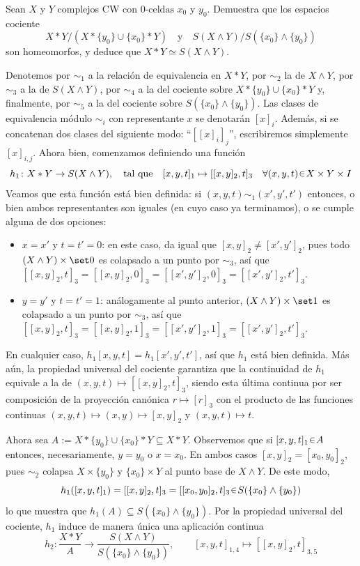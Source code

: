 \setcounter{eje}{23}
\begin{ejer}
Sean $X$ y $Y$ complejos CW con $0\text{-celdas}$ $x_0$ y $y_0$. Demuestra que los espacios cociente
\[
X * Y / (X * \{y_0\} \cup \{x_0\} * Y)
\quad \text{y} \quad
S(X \wedge Y) / S(\{x_0\} \wedge \{y_0\})
\]
son homeomorfos, y deduce que $X * Y \simeq S(X \wedge Y)$.
\end{ejer}
\begin{sol}[Demostración]
Denotemos por $\sim_1$ a la relación de equivalencia en $X*Y$, por $\sim_2$ la de $X \wedge Y$, por $\sim_3$ a la de $S(X \wedge Y)$, por $\sim_4$ a la del cociente sobre $X * \{y_0\} \cup \{x_0\} * Y$ y, finalmente, por $\sim_5$ a la del cociente sobre $S(\{x_0\} \wedge \{y_0\})$. Las clases de equivalencia módulo $\sim_i$ con representante $x$ se denotarán $[x]_i$. Además, si se concatenan dos clases del siguiente modo: \enquote{$[[x]_i]_j$}, escribiremos simplemente $[x]_{i,j}$. Ahora bien, comenzamos definiendo una función 
\[
h_1 \colon X * Y \to S(X \wedge Y),%
\quad\text{tal que}\quad%
[x,y,t]_1 \mapsto [[x,y]_2,t]_3%
\quad\forall (x,y,t)\en X \times Y \times I
\]
Veamos que esta función está bien definida: si $(x,y,t) \sim_1 (x',y',t')$ entonces, o bien ambos representantes son iguales (en cuyo caso ya terminamos), o se cumple alguna de dos opciones:
\begin{itemize}[leftmargin=1.2em]
\item $x=x'$ y $t=t'=0$: en este caso, da igual que $[x,y]_2 \neq [x',y']_2$, pues todo $(X \wedge Y) \times \set0$ es colapsado a un punto por $\sim_3$, así que $[[x,y]_2,t]_3 = [[x,y]_2,0]_3 = [[x',y']_2,0]_3 = [[x',y']_2,t']_3$.
\item $y = y'$ y $t=t'=1$: análogamente al punto anterior, $(X \wedge Y) \times \set1$ es colapsado a un punto por $\sim_3$, así que $[[x,y]_2,t]_3 = [[x,y]_2,1]_3 = [[x',y']_2,1]_3 = [[x',y']_2,t']_3$.
\end{itemize}
En cualquier caso, $h_1[x,y,t] = h_1[x',y',t']$, así que $h_1$ está bien definida. Más aún, la propiedad universal del cociente garantiza que la continuidad de $h_1$ equivale a la de $(x,y,t) \mapsto [[x,y]_2,t]_3$, siendo esta última continua por ser composición de la proyección canónica $r \mapsto [r]_3$ con el producto de las funciones continuas $(x,y,t) \mapsto (x,y) \mapsto [x,y]_2$ y $(x,y,t) \mapsto t$. 

Ahora sea $A := X * \{y_0\} \cup \{x_0\} * Y \subseteq X*Y$. 
Observemos que si $[x,y,t]_1 \en A$ entonces, necesariamente, $y=y_0$ o $x=x_0$. En ambos casos
$[x,y]_2 = [x_0,y_0]_2$, pues $\sim_2$ colapsa $X \times \{y_0\}$ y $\{x_0\} \times Y$ al punto base de 
$X\wedge Y$. De este modo,
\[
h_1([x,y,t]_1)
    = [[x,y]_2,t]_3
    = [[x_0,y_0]_2,t]_3
    \en S(\{x_0\}\wedge\{y_0\}) 
\]
lo que muestra que $h_1(A)\subseteq S(\{x_0\}\wedge\{y_0\})$. Por la propiedad universal del cociente, $h_1$
induce de manera única una aplicación continua
\[
h_2 \colon 
\frac{X*Y}{A}
\longrightarrow
\frac{S(X\wedge Y)}{S(\{x_0\}\wedge\{y_0\})},
\qquad
[x,y,t]_{1,4}\longmapsto [[x,y]_2,t]_{3,5}
\]


\end{sol}
